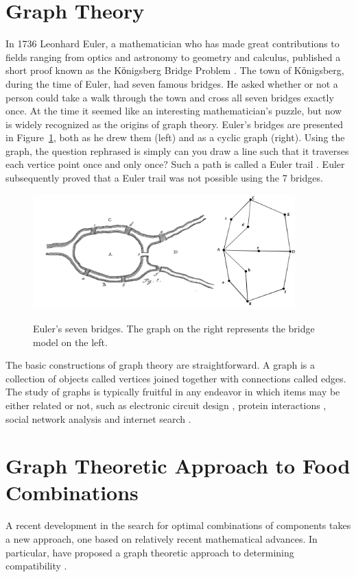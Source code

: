 \section{Graph Theory}
In 1736 Leonhard Euler, a mathematician who has made great contributions to fields ranging from optics and astronomy to geometry and calculus, published a short proof known as the Kӧnigsberg Bridge Problem \citep{Euler1736}. The town of Kӧnigsberg, during the time of Euler, had seven famous bridges.  He asked whether or not a person could take a walk through the town and cross all seven bridges exactly once.  At the time it seemed like an interesting mathematician’s puzzle, but now is widely recognized as the origins of graph theory. Euler’s bridges are presented in Figure~\ref{fig:eulerbridges}, both as he drew them (left) and as a cyclic graph (right).  Using the graph, the question rephrased is simply can you draw a line such that it traverses each vertice point once and only once?  Such a path is called a Euler trail \citep{Bollobaas1998}.  Euler subsequently proved that a Euler trail was not possible using the 7 bridges.

\begin{figure}[h!]
\caption[Euler's seven bridges.]{Euler's seven bridges.  The graph on the right represents the bridge model on the left.}
\centering
\includegraphics[width=0.9\textwidth]{./img/euler.png}
\label{fig:eulerbridges}
\end{figure}


The basic constructions of graph theory are straightforward.  A graph is a collection of objects called vertices \citep{Bollobaas1998} joined together with connections called edges.  The study of graphs is typically fruitful in any endeavor in which items may be either related or not, such as electronic circuit design \citep{Bollobaas1998},  protein interactions \citep{Palla2005}, social network analysis \citep{Knoke2008} and internet search \citep{Brin1998}.  

\section{Graph Theoretic Approach to Food Combinations}
A recent development in the search for optimal combinations of components takes a new approach, one based on relatively recent mathematical advances.  In particular, \citet{Ennisa} have proposed a graph theoretic approach to determining compatibility \citep[see also][]{Ennis2010, Ennis2011}.

